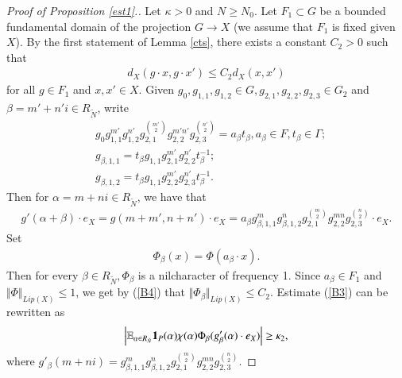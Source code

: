 \documentclass[12pt,amstex]{amsart}
\theoremstyle{definition}
\def \A {\alpha}
\def \B {\beta}
\def \D {\kappa}
\def \R {R_{\tilde{N}}}
\begin{document}
\begin{proof}[Proof of Proposition \ref{est1}.]
  Let $\D>0$ and $N\geq N_{0}$. Let $F_{1}\subset G$ be a bounded fundamental domain of the projection $G\rightarrow X$ (we assume that $F_{1}$ is fixed given $X$). By the first statement of Lemma
  \ref{cts}, there exists a constant $C_{2}>0$ such that
  \begin{equation}\label{B4}
  \begin{split}
   d_{X}(g\cdot x,g\cdot x')\leq C_{2}d_{X}(x,x')
  \end{split}
  \end{equation}
for all $g\in F_{1}$ and $x,x'\in X$. Given $g_{0},g_{1,1},g_{1,2}\in G, g_{2,1},g_{2,2},g_{2,3}\in G_{2}$ and $\B=m'+n'i\in \R$, write
  \begin{equation}\nonumber
  \begin{split}
   & g_{0}g_{1,1}^{m'}g_{1,2}^{n'}g_{2,1}^{\binom{m'}{2}}g_{2,2}^{m'n'}g_{2,3}^{\binom{n'}{2}}=a_{\B}t_{\B}, a_{\B}\in F, t_{\B}\in\Gamma;
   \\& g_{\B,1,1}=t_{\B}g_{1,1}g_{2,1}^{m'}g_{2,2}^{n'}t_{\B}^{-1};
   \\& g_{\B,1,2}=t_{\B}g_{1,1}g_{2,2}^{m'}g_{2,3}^{n'}t_{\B}^{-1}.
  \end{split}
  \end{equation}
Then for $\A=m+ni\in \R$, we have that
  \begin{equation}\nonumber
  \begin{split}
  g'(\A+\B)\cdot e_{X}=g(m+m',n+n')\cdot e_{X}=a_{\B}g_{\B,1,1}^{m}g_{\B,1,2}^{n}g_{2,1}^{\binom{m}{2}}g_{2,2}^{mn}g_{2,3}^{\binom{n}{2}}\cdot e_{X}.
  \end{split}
  \end{equation}
Set
  \begin{equation}\nonumber
  \begin{split}
 \Phi_{\B}(x)=\Phi(a_{\B}\cdot x).
  \end{split}
  \end{equation}
Then for every $\B\in \R, \Phi_{\B}$ is a nilcharacter of frequency 1. Since $a_{\B}\in F_{1}$ and $\Vert\Phi\Vert_{Lip(X)}\leq 1$, we get by (\ref{B4}) that  $\Vert\Phi_{\B}\Vert_{Lip(X)}\leq C_{2}$. Estimate (\ref{B3}) can be rewritten as
     \begin{equation}\nonumber
  \begin{split}
    \Bigl\vert\mathbb{E}_{\A\in \R}\bold{1}_{P}(\A)\chi(\A)\Phi_{\B}(g'_{\B}(\A)\cdot e_{X})\Bigr\vert\geq\D_{2},
  \end{split}
  \end{equation}
where $g'_{\B}(m+ni)=g_{\B,1,1}^{m}g_{\B,1,2}^{n}g_{2,1}^{\binom{m}{2}}g_{2,2}^{mn}g_{2,3}^{\binom{n}{2}}$. 

\end{proof}
\end{document}
